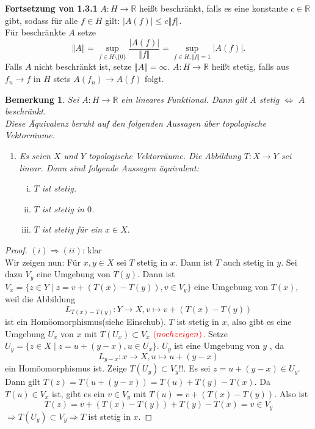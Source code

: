 \documentclass[12pt,titlepage]{article}
\newtheorem{bemerkung}[zahl]{Bemerkung}
\numberwithin{equation}{section}
\begin{document}
\textbf{Fortsetzung von 1.3.1}
$A:H \to \mathbb{R}$ heißt beschränkt, falls es eine konstante $c\in \mathbb{R}$ gibt, sodass für alle $f \in H$ gilt: $\vert A(f) \vert \leq c \Vert f \Vert .$\\
Für beschränkte $A$ setze 
\[
\Vert A \Vert = \underset{f\in H\setminus \{0\}}{\sup} \frac{\vert A(f)\vert}{\Vert f\Vert }=\underset{f\in H,\Vert f\Vert=1}{\sup}\vert A(f)\vert.
\]
Falls $A$ nicht beschränkt ist, setze $\Vert A \Vert =\infty.$ $A:H\to \mathbb{R}$ heißt stetig, falls aus $f_n \rightarrow f$ in $H$ stets $A(f_n)\rightarrow A(f)$ folgt.
\begin{bemerkung}
Sei $A:H \to \mathbb{R}$ ein lineares Funktional. Dann gilt $A$ stetig $\Leftrightarrow$ $A$ beschränkt.\\
Diese Äquivalenz beruht auf den folgenden Aussagen über topologische Vektorräume.
\begin{enumerate}
\item Es seien $X$ und $Y$ topologische Vektorräume. Die Abbildung $T:X\to Y$ sei linear. Dann sind folgende Aussagen äquivalent:
\begin{enumerate}[(i)]
\item $T$ ist stetig.
\item $T$ ist stetig in $0$.
\item $T$ ist stetig für ein $x\in X.$
\end{enumerate}
\end{enumerate}
\end{bemerkung}
\begin{proof}
$(i) \Rightarrow (ii)$: klar\\
Wir zeigen nun: Für $x,y\in X$ sei $T$ stetig in $x$. Dann ist $T$ auch stetig in $y$. Sei dazu $V_y$ eine Umgebung von $T(y)$. Dann ist $V_x=\{z\in Y\mid z=v+(T(x)-T(y)),v\in V_y\}$ eine Umgebung von $T(x)$, weil die Abbildung 
\[
L_{T(x)-T(y)}:Y \to X,v \mapsto v+(T(x)-T(y))
\]  ist ein Homöomorphismus(siehe Einschub). $T$ ist stetig in $x$, also gibt es eine Umgebung $U_x$ von $x$ mit $T(U_x) \subset V_x$ $\textcolor{red}{(noch zeigen)}$. Setze $U_y=\{ z\in X \mid z =u+(y-x),u\in U_x\}.$ $U_y$ ist eine Umgebung von $y$ , da 
\[
L_{y-x}:x \to X, u \mapsto u+(y-x)
\] ein Homöomorphismus ist. Zeige $T(U_y) \subset V_y!!$. Es sei $z=u+(y-x) \in U_y.$ Dann gilt $T(z)= T(u+(y-x))=T(u)+T(y)-T(x).$ Da $T(u)\in V_x$ ist, gibt es ein $v\in V_y$ mit $T(u)=v+(T(x)-T(y)).$ Also ist 
\[
T(z)=v+(T(x)-T(y))+T(y)-T(x)=v\in V_y
\]
$\Rightarrow T(U_y) \subset V_y\Rightarrow T$ ist stetig in $x$. 

\end{proof}
\end{document}
